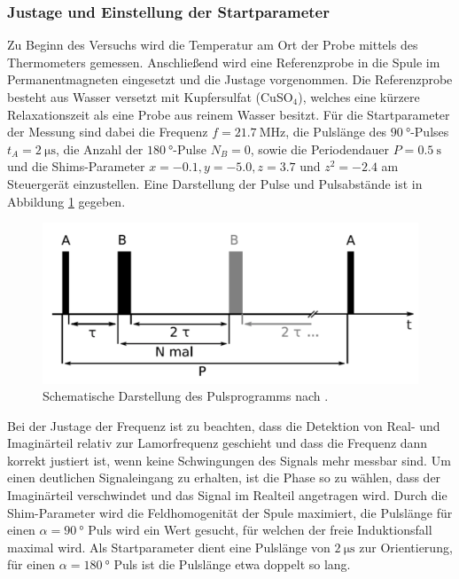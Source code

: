 \subsubsection{Justage und Einstellung der Startparameter}
\noindent Zu Beginn des Versuchs wird die Temperatur am Ort der Probe mittels
des Thermometers gemessen. Anschließend wird eine Referenzprobe in die Spule im
Permanentmagneten eingesetzt und die Justage vorgenommen. Die Referenzprobe
besteht aus Wasser versetzt mit Kupfersulfat (CuSO$_4$), welches eine kürzere
Relaxationszeit als eine Probe aus reinem Wasser besitzt. Für die Startparameter
der Messung sind dabei die Frequenz $f = \SI{21.7}{\mega\hertz}$, die Pulslänge des $\SI{90}{\degree}$-Pulses $t_A =
\SI{2}{\micro\second}$, die Anzahl der $\SI{180}{\degree}$-Pulse $N_B = 0$, sowie die Periodendauer
$P = \SI{0.5}{\second}$ und die Shims-Parameter $x = -0.1, y = -5.0, z = 3.7$
und $z^2 = -2.4$ am Steuergerät einzustellen. Eine Darstellung der Pulse und
Pulsabstände ist in Abbildung \ref{fig:pulse} gegeben. \\
\FloatBarrier
\begin{figure}
  \centering
  \includegraphics[scale=0.3]{resources/pulse.png}
  \caption{Schematische Darstellung des Pulsprogramms nach \cite{sample}.}
  \label{fig:pulse}
\end{figure}
\FloatBarrier
\noindent Bei der Justage der Frequenz ist
zu beachten, dass die Detektion von Real- und Imaginärteil relativ zur
Lamorfrequenz geschieht und dass die Frequenz dann korrekt justiert ist, wenn
keine Schwingungen des Signals mehr messbar sind. Um einen deutlichen
Signaleingang zu erhalten, ist die Phase so zu wählen, dass der Imaginärteil
verschwindet und das Signal im Realteil angetragen wird. Durch die
Shim-Parameter wird die Feldhomogenität der Spule maximiert, die Pulslänge
für einen $\alpha = \SI{90}{\degree}$ Puls wird ein Wert gesucht, für welchen
der freie Induktionsfall maximal wird. Als Startparameter dient eine Pulslänge
von $\SI{2}{\micro\second}$ zur Orientierung, für einen $\alpha = \SI{180}{\degree}$ Puls
ist die Pulslänge etwa doppelt so lang. \\
